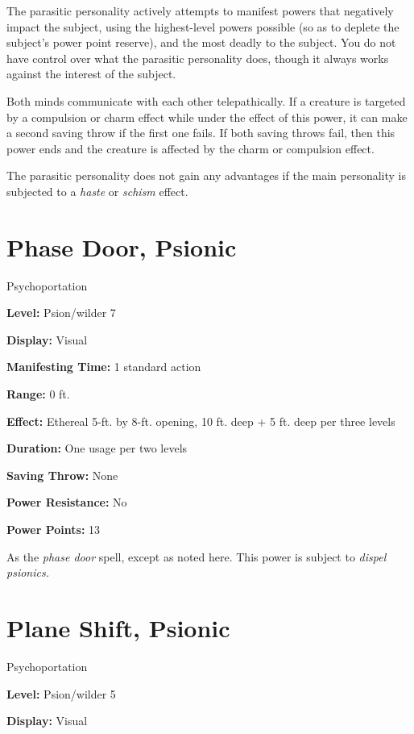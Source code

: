 \documentclass{article}
\begin{document}
The parasitic personality actively attempts to manifest powers that negatively 
impact the subject, using the highest-level powers possible (so as to deplete the 
subject's power point reserve), and the most deadly to the subject. You do not 
have control over what the parasitic personality does, though it always works against 
the interest of the subject.

Both minds communicate with each other telepathically. If a creature is targeted 
by a compulsion or charm effect while under the effect of this power, it can make 
a second saving throw if the first one fails. If both saving throws fail, then 
this power ends and the creature is affected by the charm or compulsion effect.

The parasitic personality does not gain any advantages if the main personality 
is subjected to a \textit{haste }or \textit{schism }effect.

\vspace{12pt}
\section*{Phase Door, Psionic}

Psychoportation

\textbf{Level:} Psion/wilder 7

\textbf{Display:} Visual

\textbf{Manifesting Time:} 1 standard action

\textbf{Range:} 0 ft.

\textbf{Effect:} Ethereal 5-ft. by 8-ft. opening, 10 ft. deep + 5 ft. deep per 
three levels

\textbf{Duration:} One usage per two levels

\textbf{Saving Throw:} None

\textbf{Power Resistance:} No

\textbf{Power Points:} 13

As the \textit{phase door }spell, except as noted here. This power is subject to 
\textit{dispel psionics.}

\vspace{12pt}
\section*{Plane Shift, Psionic}

Psychoportation

\textbf{Level:} Psion/wilder 5

\textbf{Display:} Visual
\end{document}
